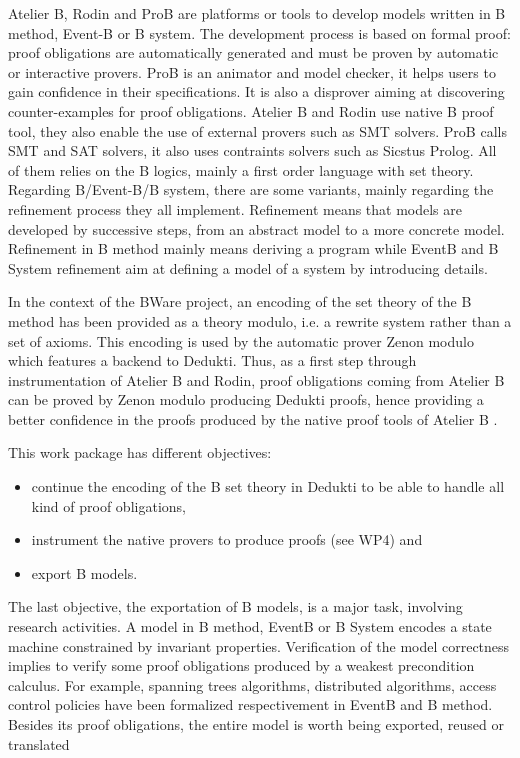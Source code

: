 


Atelier B, Rodin and ProB are platforms or tools to develop models
written in B method, Event-B or B system. The development process is
based on formal proof: proof obligations are automatically  generated
and must be proven by automatic or interactive provers. ProB is an
animator and model checker, it helps users to gain confidence in their
specifications. It is also a disprover aiming at  discovering
counter-examples for proof obligations. Atelier B and Rodin use native
B proof tool, they also enable the use of external provers such as SMT
solvers. ProB calls SMT and SAT solvers, it also uses contraints
solvers such as Sicstus Prolog. All of them relies on the B logics,
mainly a first order language with set theory. Regarding B/Event-B/B
system, there are some variants, mainly regarding the refinement
process they all implement. Refinement means that models are developed
by successive steps, from an abstract model to a more  concrete
model. Refinement in B method mainly means deriving a program while
EventB and B System refinement aim at defining a model of a system by
introducing details.


In the context of the BWare project, an encoding of the set theory of
the B method has been provided as a theory modulo, i.e. a rewrite
system rather than a set of axioms. This encoding is used by the
automatic prover Zenon modulo which features a backend to
Dedukti. Thus, as a first step through instrumentation of Atelier B
and Rodin, proof obligations coming from Atelier B can be proved by
Zenon modulo producing Dedukti proofs, hence providing a better
confidence in the proofs produced by the native proof tools of Atelier
B \cite{Bware}.


This work package has different objectives:
\begin{itemize}
\item continue the encoding
of the B set theory in Dedukti to be able to handle all kind of proof
obligations,
\item instrument the native provers to produce proofs (see
WP4) and
\item export B models.
\end{itemize}

The last objective, the exportation of  B models,
is a major task, involving research activities. A model in B method,
EventB or B System encodes a state machine constrained by
invariant properties. Verification of the model correctness implies to
verify some proof obligations produced by a weakest precondition
calculus. For example, spanning trees algorithms, distributed
algorithms, access control policies have been formalized
respectivement in EventB and B method. Besides its proof obligations,
the entire model  is worth
being exported, reused or translated 


